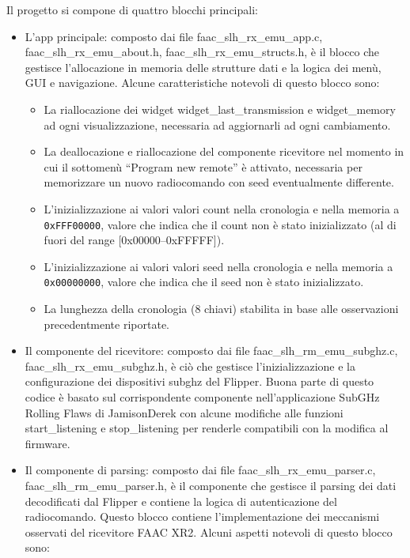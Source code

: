 Il progetto si compone di quattro blocchi principali:
\begin{itemize}
  \item L’app principale: composto dai file faac\_slh\_rx\_emu\_app.c, faac\_slh\_rx\_emu\_about.h, faac\_slh\_rx\_emu\_structs.h, è il blocco che gestisce l’allocazione in memoria delle strutture dati e la logica dei menù, GUI e navigazione. Alcune caratteristiche notevoli di questo blocco sono:
  \begin{itemize}
    \item La riallocazione dei widget widget\_last\_transmission e widget\_memory ad ogni visualizzazione, necessaria ad aggiornarli ad ogni cambiamento.
    \item La deallocazione e riallocazione del componente ricevitore nel momento in cui il sottomenù “Program new remote” è attivato, necessaria per memorizzare un nuovo radiocomando con seed eventualmente differente.
    \item L’inizializzazione ai valori valori count nella cronologia e nella memoria a \texttt{0xFFF00000}, valore che indica che il count non è stato inizializzato (al di fuori del range [0x00000--0xFFFFF]).
    \item L’inizializzazione ai valori valori seed nella cronologia e nella memoria a \texttt{0x00000000}, valore che indica che il seed non è stato inizializzato.
    \item La lunghezza della cronologia (8 chiavi) stabilita in base alle osservazioni precedentmente riportate.
  \end{itemize}
  \item Il componente del ricevitore: composto dai file faac\_slh\_rm\_emu\_subghz.c, faac\_slh\_rx\_emu\_subghz.h, è ciò che gestisce l’inizializzazione e la configurazione dei dispositivi subghz del Flipper. Buona parte di questo codice è basato sul corrispondente componente nell’applicazione SubGHz Rolling Flaws di JamisonDerek \cite{rolling_flaws} con alcune modifiche alle funzioni start\_listening e stop\_listening per renderle compatibili con la modifica al firmware.
  \item Il componente di parsing: composto dai file faac\_slh\_rx\_emu\_parser.c, faac\_slh\_rm\_emu\_parser.h, è il componente che gestisce il parsing dei dati decodificati dal Flipper e contiene la logica di autenticazione del radiocomando. Questo blocco contiene l’implementazione dei meccanismi osservati del ricevitore FAAC XR2. Alcuni aspetti notevoli di questo blocco sono:
  \begin{itemize}

\end{itemize}
\end{itemize}
